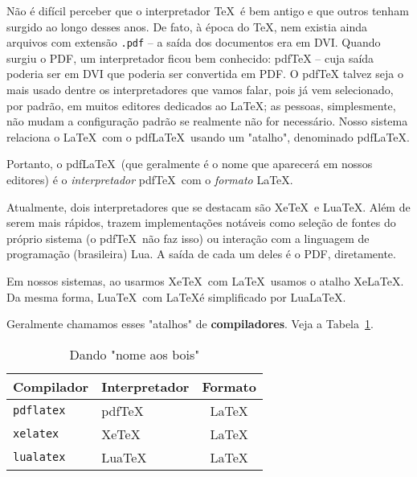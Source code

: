 Não é difícil perceber que o interpretador \TeX\ é bem antigo e que outros tenham
surgido ao longo desses anos.
De fato, à época do \TeX, nem existia ainda arquivos com extensão  \texttt{.pdf} 
-- a saída dos documentos era em DVI.
Quando surgiu o PDF, um interpretador ficou bem conhecido: pdf\TeX{} -- cuja saída
poderia ser em DVI que poderia ser convertida em PDF. 
O pdf\TeX{} talvez seja o mais usado dentre os interpretadores que vamos falar, 
pois já vem selecionado, por padrão, em muitos editores dedicados ao \LaTeX{}; as pessoas, simplesmente, não mudam a configuração padrão se realmente não 
for necessário.
Nosso sistema relaciona o \LaTeX\ com o pdf\LaTeX\ usando um "atalho", denominado
pdf\LaTeX.

Portanto, o pdf\LaTeX\ (que geralmente é o nome que aparecerá em nossos editores) 
é o \textit{interpretador} pdf\TeX\ com o \textit{formato} \LaTeX. 

Atualmente, dois interpretadores que se destacam são Xe\TeX\ e Lua\TeX.
Além de serem mais rápidos, trazem implementações notáveis como seleção de fontes 
do próprio sistema (o pdf\TeX\ não faz isso) ou interação com a linguagem de 
programação (brasileira) Lua.
A saída de cada um deles é o PDF, diretamente.

 
Em nossos sistemas, ao usarmos Xe\TeX\ com \LaTeX\ usamos o atalho Xe\LaTeX.
Da mesma forma, Lua\TeX\ com \LaTeX é simplificado por Lua\LaTeX.

Geralmente chamamos esses "atalhos" de \textbf{compiladores}.
Veja a Tabela~\ref{tab:compiladores}.

\begin{table}[!htbp]
  \centering
  \begin{tabular}{llc}
    \toprule
      \textbf{Compilador} & \textbf{Interpretador} & \textbf{Formato}\\
    \midrule
      \texttt{pdflatex} & pdf\TeX & \LaTeX\\
      \texttt{xelatex}  & Xe\TeX  & \LaTeX\\
      \texttt{lualatex} & Lua\TeX & \LaTeX\\
    \bottomrule
  \end{tabular}
  \caption{Dando "nome aos bois"}
  \label{tab:compiladores}
\end{table}

